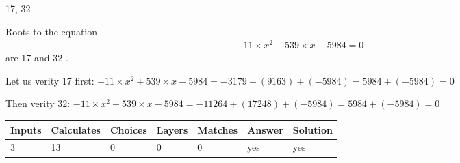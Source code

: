 \documentclass[12pt]{article}
\begin{document}
 

17,  %
32
 
 
 
\noindent{}
 
 

 
 
 
\noindent{}
 
 

Roots to the equation
\begin{eqnarray*}
-11 \times x^2  %
+  %
539
                 \times x    %
-5984 =0
\end{eqnarray*}
are  %
17 and  %
32 .
 
Let us verity  %
17 first:
$  %
-11 \times x^2  %
+  %
539
                 \times x    %
-5984
  = %
-3179+( %
9163)+( %
-5984)
  = %
5984+( %
-5984)
  = %
0
$
 
Then verity  %
32:
$  %
-11 \times x^2  %
+  %
539
                 \times x    %
-5984
  = %
-11264+( %
17248)+( %
-5984)
  = %
5984+( %
-5984)
  = %
0
$
 
 
 
\noindent{}
 
 

 
\vspace{0.3in}
   
   
   
   
\noindent\begin{tabular}{|l|l|l|l|l|l|l|}
 \hline
Inputs & Calculates & Choices & Layers & Matches & Answer & Solution \\ \hline
           3  & 
          13  & 
           0
  & 
           0  & 
           0  & 
  yes & 
  yes 
  \\ \hline
 \end{tabular}
   
   
   
   
\noindent{}
   
   
  
\end{document}
